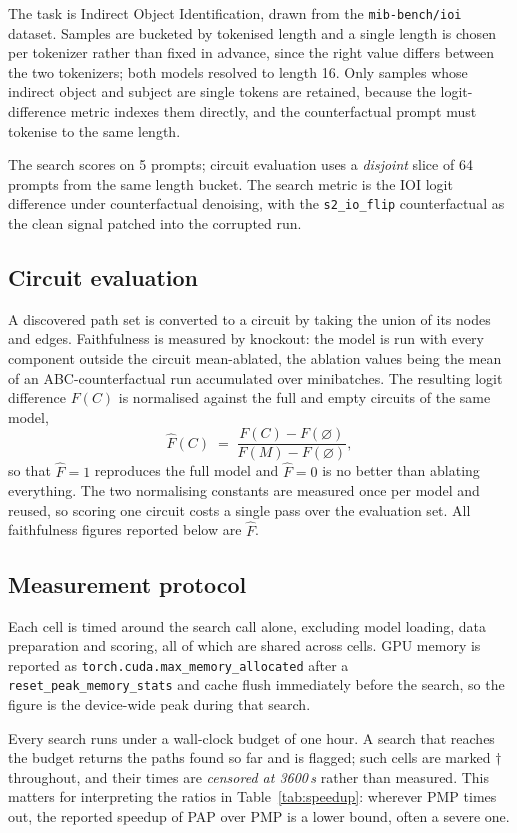 \documentclass[11pt,a4paper]{article}
\begin{document}
The task is Indirect Object Identification, drawn from the \texttt{mib-bench/ioi} dataset.
Samples are bucketed by tokenised length and a single length is chosen per tokenizer rather
than fixed in advance, since the right value differs between the two tokenizers; both models
resolved to length 16. Only samples whose indirect object and subject are
single tokens are retained, because the logit-difference metric indexes them directly, and the
counterfactual prompt must tokenise to the same length.

The search scores on 5 prompts; circuit evaluation uses a \emph{disjoint} slice of
64 prompts from the same length bucket. The search metric is the IOI logit difference
under counterfactual denoising, with the \texttt{s2\_io\_flip} counterfactual as the clean
signal patched into the corrupted run.

\subsection{Circuit evaluation}

A discovered path set is converted to a circuit by taking the union of its nodes and edges.
Faithfulness is measured by knockout: the model is run with every component outside the circuit
mean-ablated, the ablation values being the mean of an ABC-counterfactual run accumulated over
minibatches. The resulting logit difference $F(C)$ is normalised against the full and empty
circuits of the same model,
\[
  \widehat{F}(C) \;=\; \frac{F(C) - F(\varnothing)}{F(M) - F(\varnothing)},
\]
so that $\widehat{F} = 1$ reproduces the full model and $\widehat{F} = 0$ is no better than
ablating everything. The two normalising constants are measured once per model and reused, so
scoring one circuit costs a single pass over the evaluation set. All faithfulness figures
reported below are $\widehat{F}$.

\subsection{Measurement protocol}

Each cell is timed around the search call alone, excluding model loading, data preparation and
scoring, all of which are shared across cells. GPU memory is reported as
\texttt{torch.cuda.max\_memory\_allocated} after a \texttt{reset\_peak\_memory\_stats} and cache
flush immediately before the search, so the figure is the device-wide peak during that search.

Every search runs under a wall-clock budget of one hour. A search that reaches the budget
returns the paths found so far and is flagged; such cells are marked $\dagger$ throughout, and
their times are \emph{censored at 3600\,s} rather than measured. This matters for interpreting
the ratios in Table~\ref{tab:speedup}: wherever PMP times out, the reported speedup of PAP over
PMP is a lower bound, often a severe one.
\end{document}
